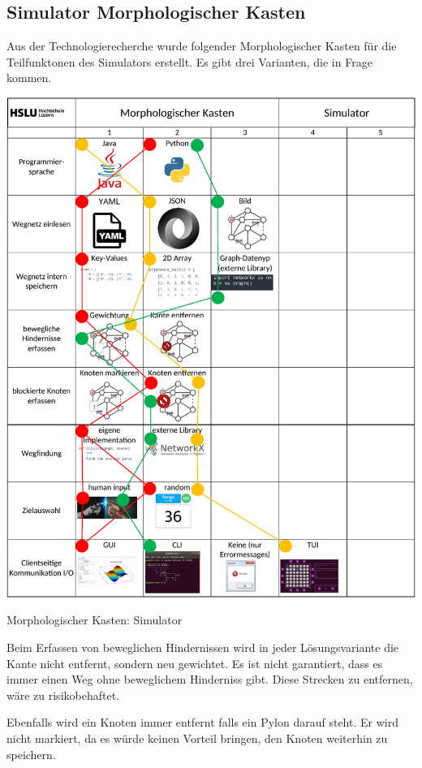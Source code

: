 \subsection{Simulator Morphologischer Kasten}


Aus der Technologierecherche wurde folgender Morphologischer Kasten für die Teilfunktonen des Simulators erstellt. Es gibt drei Varianten, die in Frage kommen.

\begin{table}[H]
\centering
\includegraphics[width=\textwidth]{assets/MK_Simulator.pdf}
\caption{Morphologischer Kasten: Simulator}
\label{table:mk-simulator}
\end{table}



Beim Erfassen von beweglichen Hindernissen wird in jeder Lösungsvariante die Kante nicht entfernt, sondern neu gewichtet. Es ist nicht garantiert, dass es immer einen Weg ohne beweglichem Hinderniss gibt. Diese Strecken zu entfernen, wäre zu risikobehaftet.

Ebenfalls wird ein Knoten immer entfernt falls ein Pylon darauf steht. Er wird nicht markiert, da es würde keinen Vorteil bringen, den Knoten weiterhin zu speichern.


